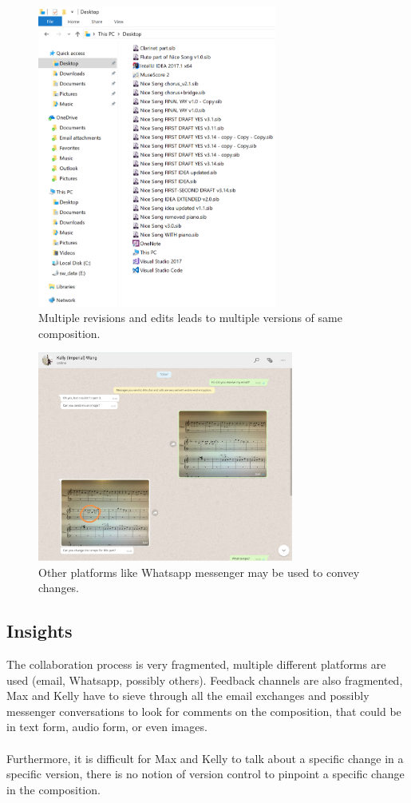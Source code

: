 \documentclass[a4paper]{article}
\begin{document}
\begin{figure}[th]
\centering
\includegraphics[width=0.7\textwidth]{Desktop_Folder.png}
\caption{\label{fig:desktop}Multiple revisions and edits leads to multiple versions of same composition.}
\end{figure}

\begin{figure}[th]
\centering
\includegraphics[width=0.75\textwidth]{Whatsapp1.png}
\caption{\label{fig:wa}Other platforms like Whatsapp messenger may be used to convey changes.}
\end{figure}

\subsection{Insights}
The collaboration process is very fragmented, multiple different platforms are used (email, Whatsapp, possibly others). Feedback channels are also fragmented, Max and Kelly have to sieve through all the email exchanges and possibly messenger conversations to look for comments on the composition, that could be in text form, audio form, or even images.\\
\\
Furthermore, it is difficult for Max and Kelly to talk about a specific change in a specific version, there is no notion of version control to pinpoint a specific change in the composition.
\end{document}
